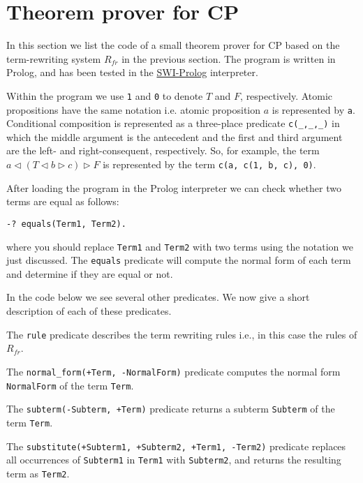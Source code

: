 \documentclass[a4paper,twoside,openright]{report}
\newcommand{\lef}{\ensuremath{\triangleleft}}
\newcommand{\rig}{\ensuremath{\triangleright}}
\begin{document}
\section{Theorem prover for CP}

In this section we list the code of a small theorem prover for CP based on the term-rewriting system $R_{fr}$ in the previous section. The program is written in Prolog, and has been tested in the \href{http://www.swi-prolog.org}{SWI-Prolog} interpreter.

Within the program we use \verb|1| and \verb|0| to denote $T$ and $F$, respectively. Atomic propositions have the same notation i.e. atomic proposition $a$ is represented by \verb|a|. Conditional composition is represented as a three-place predicate \verb|c(_,_,_)| in which the middle argument is the antecedent and the first and third argument are the left- and right-consequent, respectively. So, for example, the term $a\lef (T\lef b\rig c)\rig F$ is represented by the term \verb|c(a, c(1, b, c), 0)|.

After loading the program in the Prolog interpreter we can check whether two terms are equal as follows:
\begin{verbatim}
-? equals(Term1, Term2).
\end{verbatim}
where you should replace \verb|Term1| and \verb|Term2| with two terms using the notation we just discussed. The \verb|equals| predicate will compute the normal form of each term and determine if they are equal or not.

In the code below we see several other predicates. We now give a short description of each of these predicates.

The \verb|rule| predicate describes the term rewriting rules i.e., in this case the rules of $R_{fr}$.

The \verb|normal_form(+Term, -NormalForm)| predicate computes the normal form \verb|NormalForm| of the term \verb|Term|.

The \verb|subterm(-Subterm, +Term)| predicate returns a subterm \verb|Subterm| of the term \verb|Term|. 

The \verb|substitute(+Subterm1, +Subterm2, +Term1, -Term2)| predicate replaces all occurrences of \verb|Subterm1| in \verb|Term1| with \verb|Subterm2|, and returns the resulting term as \verb|Term2|.
 
\end{document}
